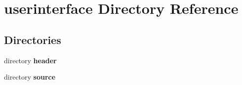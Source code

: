 \section{userinterface Directory Reference}
\label{dir_f799edd10208339a0006d96ec5415ac8}
\subsection*{Directories}
\begin{DoxyCompactItemize}
\item 
directory {\bf header}
\item 
directory {\bf source}
\end{DoxyCompactItemize}
